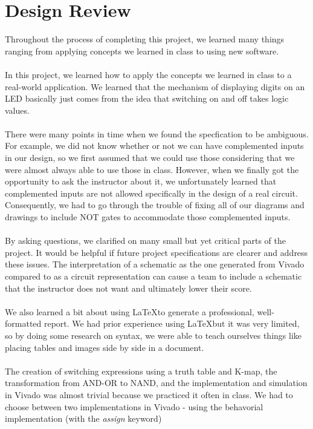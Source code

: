 \documentclass{article}
\begin{document}
\section{Design Review}
Throughout the process of completing this project, we learned many things 
ranging from applying concepts we learned in class to using new software.\\
\\
In this project, we learned how to apply the concepts we learned in class to a 
real-world application. We learned that the mechanism of displaying digits on 
an LED basically just comes from the idea that switching on and off takes
logic values.  \\
\\
There were many points in time when we found the specfication to be ambiguous. 
For example, we did not know whether or not we can have complemented inputs
in our design, so we first assumed that we could use those considering that we 
were almost always able to use those in class. However, when we finally got 
the opportunity to ask the instructor about it, we unfortunately learned that 
complemented inputs are not allowed specifically in the design of a real 
circuit. Consequently, we had to go through the trouble of fixing all of our 
diagrams and drawings to include NOT gates to accommodate those complemented 
inputs.\\
\\
By asking questions, we clarified on many small but yet critical parts of the 
project. It would be helpful if future project specifications are clearer and 
address these issues. The interpretation of a schematic as the one generated 
from Vivado compared to as a circuit representation can cause a team to include
 a schematic that the instructor does not want and ultimately lower their 
score.\\
\\
We also learned a bit about using \LaTeX to generate a professional, 
well-formatted report. We had prior experience using \LaTeX but it was very 
limited, so by doing some research on syntax, we were able to teach ourselves 
things like placing tables and images side by side in a document.\\
\\
The creation of switching expressions using a truth 
table and K-map, the transformation from AND-OR to NAND, and the 
implementation and simulation in Vivado was almost trivial because we 
practiced it often in class. We had to choose between two implementations in 
Vivado - using the behavorial implementation (with the \textit{assign} keyword) 
\end{document}
